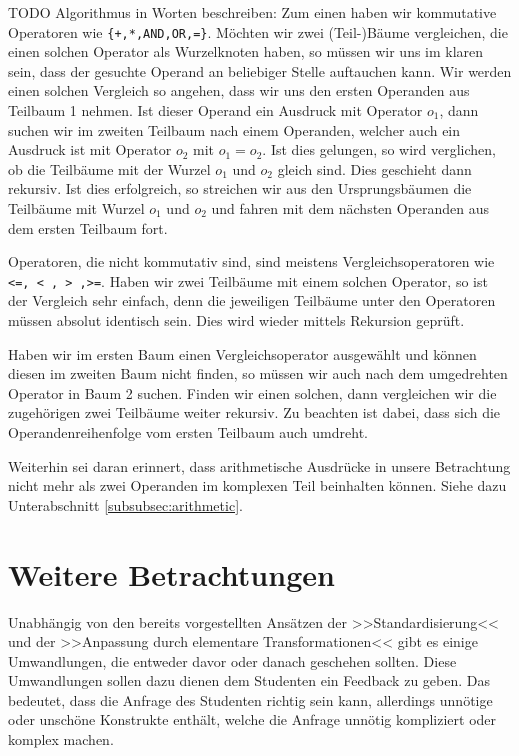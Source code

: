 TODO Algorithmus in Worten beschreiben: 
Zum einen haben wir kommutative Operatoren wie \verb|{+,*,AND,OR,=}|. Möchten wir zwei (Teil-)Bäume vergleichen, die einen solchen Operator als Wurzelknoten haben, so müssen wir uns im klaren sein, dass der gesuchte Operand an beliebiger Stelle auftauchen kann. Wir werden einen solchen Vergleich so angehen, dass wir uns den ersten Operanden aus Teilbaum 1 nehmen. Ist dieser Operand ein Ausdruck mit Operator $o_1$, dann suchen wir im zweiten Teilbaum nach einem Operanden, welcher auch ein Ausdruck ist mit Operator $o_2$ mit $o_1=o_2$. Ist dies gelungen, so wird verglichen, ob die Teilbäume mit der Wurzel $o_1$ und $o_2$ gleich sind. Dies geschieht dann rekursiv. Ist dies erfolgreich, so streichen wir aus den Ursprungsbäumen die Teilbäume mit Wurzel $o_1$ und $o_2$ und fahren mit dem nächsten Operanden aus dem ersten Teilbaum fort.

Operatoren, die nicht kommutativ sind, sind meistens Vergleichsoperatoren wie \verb|<=, < , > ,>=|. Haben wir zwei Teilbäume mit einem solchen Operator, so ist der Vergleich sehr einfach, denn die jeweiligen Teilbäume unter den Operatoren müssen absolut identisch sein. Dies wird wieder mittels Rekursion geprüft.

Haben wir im ersten Baum einen Vergleichsoperator ausgewählt und können diesen im zweiten Baum nicht finden, so müssen wir auch nach dem umgedrehten Operator in Baum 2 suchen. Finden wir einen solchen, dann vergleichen wir die zugehörigen zwei Teilbäume weiter rekursiv. Zu beachten ist dabei, dass sich die Operandenreihenfolge vom ersten Teilbaum auch umdreht.

Weiterhin sei daran erinnert, dass arithmetische Ausdrücke in unsere Betrachtung nicht mehr als zwei Operanden im komplexen Teil beinhalten können. Siehe dazu Unterabschnitt \ref{subsubsec:arithmetic}.

\section{Weitere Betrachtungen}

Unabhängig von den bereits vorgestellten Ansätzen der >>Standardisierung<< und der >>Anpassung durch elementare Transformationen<< gibt es einige Umwandlungen, die entweder davor oder danach geschehen sollten. Diese Umwandlungen sollen dazu dienen dem Studenten ein Feedback zu geben. Das bedeutet, dass die Anfrage des Studenten richtig sein kann, allerdings unnötige oder unschöne Konstrukte enthält, welche die Anfrage unnötig kompliziert oder komplex machen.

